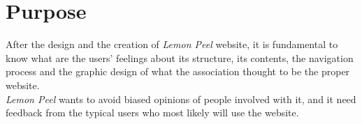 \documentclass[../../UsabilityReport.tex]{subfiles}
\begin{document}
\section{Purpose}
	After the design and the creation of \textit{Lemon Peel} website, it is fundamental to know what are the users' feelings about its structure, its contents, the navigation process and the graphic design of what the association thought to be the proper website.\\
	\textit{Lemon Peel} wants to avoid biased opinions of people involved with it, and it need feedback from the typical users who most likely will use the website.
\end{document}
